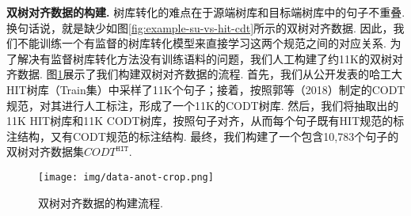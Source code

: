 
\textbf{双树对齐数据的构建.  } 树库转化的难点在于源端树库和目标端树库中的句子不重叠.
换句话说，就是缺少如图\ref{fig:example-su-vs-hit-cdt}所示的双树对齐数据.
因此，我们不能训练一个有监督的树库转化模型来直接学习这两个规范之间的对应关系.
为了解决有监督树库转化方法没有训练语料的问题，我们人工构建了约11K的双树对齐数据. 图\ref{fig:data_anot}展示了我们构建双树对齐数据的流程. 首先，我们从公开发表的哈工大HIT树库（Train集）中采样了11K个句子；接着，按照郭等（2018）制定的CODT规范，对其进行人工标注，形成了一个11K的CODT树库. 然后，我们将抽取出的11K HIT树库和11K CODT树库，按照句子对齐，从而每个句子既有HIT规范的标注结构，又有CODT规范的标注结构. 最终，我们构建了一个包含10,783个句子的双树对齐数据集$CODT^{\texttt{HIT}}$.

\begin{figure}[hb]
    \centering
    \texttt{[image: img/data-anot-crop.png]}
    \caption{双树对齐数据的构建流程. }
    \label{fig:data_anot}
\end{figure}

